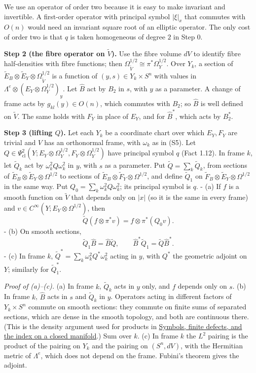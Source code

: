 \documentclass[
  11pt,
]{article}
\begin{document}
We use an operator of order two because it is easy to make invariant and
invertible. A first-order operator with principal symbol \(|\xi|_x\)
that commutes with \(O(n)\) would need an invariant square root of an
elliptic operator. The only cost of order two is that \(q\) is taken
homogeneous of degree \(2\) in Step 0.

\textbf{Step 2 (the fibre operator on \(\tilde V\)).} Use the fibre
volume \(dV\) to identify fibre half-densities with fibre functions;
then \(\Omega^{1/2}_{\tilde V}\cong\pi^*\Omega^{1/2}_Y\). Over \(Y_k\),
a section of
\(\tilde E_B\otimes\tilde E_Y\otimes\Omega^{1/2}_{\tilde V}\) is a
function of \((y,s)\in Y_k\times S^n\) with values in
\(\Lambda^e\otimes(E_Y\otimes\Omega^{1/2}_Y)_y\). Let \(\hat B\) act by
\(B_2\) in \(s\), with \(y\) as a parameter. A change of frame acts by
\(g_{kl}(y)\in O(n)\), which commutes with \(B_2\); so \(\hat B\) is
well defined on \(\tilde V\). The same holds with \(F_Y\) in place of
\(E_Y\), and for \(\hat B^*\), which acts by \(B_2^*\).

\textbf{Step 3 (lifting \(Q\)).} Let each \(Y_k\) be a coordinate chart
over which \(E_Y,F_Y\) are trivial and \(V\) has an orthonormal frame,
with \(\omega_k\) as in (S5). Let
\(Q\in\Psi^2_{\mathrm{cl}}(Y;E_Y\otimes\Omega_Y^{1/2},F_Y\otimes\Omega_Y^{1/2})\)
have principal symbol \(q\) (Fact 1.12). In frame \(k\), let
\(\tilde Q_k\) act by \(\omega_k^2Q\omega_k^2\) in \(y\), with \(s\) as
a parameter. Put \(\tilde Q=\sum_k\tilde Q_k\), from sections of
\(\tilde E_B\otimes\tilde E_Y\otimes\Omega^{1/2}\) to sections of
\(\tilde E_B\otimes\tilde F_Y\otimes\Omega^{1/2}\), and define
\(\tilde Q_1\) on \(\tilde F_B\otimes\tilde E_Y\otimes\Omega^{1/2}\) in
the same way. Put \(Q_0=\sum_k\omega_k^2Q\omega_k^2\); its principal
symbol is \(q\). - (a) If \(f\) is a smooth function on \(\tilde V\)
that depends only on \(|x|\) (so it is the same in every frame) and
\(v\in C^\infty(Y;E_Y\otimes\Omega^{1/2})\), then \[
\tilde Q(f\otimes\pi^*v)=f\otimes\pi^*(Q_0v).
\tag{10.2}
\] - (b) On smooth sections, \[
\tilde Q_1\hat B=\hat B\tilde Q,\qquad \hat B^*\tilde Q_1=\tilde Q\hat B^* .
\tag{10.3}
\] - (c) In frame \(k\), \(\tilde Q^*=\sum_k\omega_k^2Q^*\omega_k^2\)
acting in \(y\), with \(Q^*\) the geometric adjoint on \(Y\); similarly
for \(\tilde Q_1^*\).

\emph{Proof of (a)--(c).} (a) In frame \(k\), \(\tilde Q_k\) acts in
\(y\) only, and \(f\) depends only on \(s\). (b) In frame \(k\),
\(\hat B\) acts in \(s\) and \(\tilde Q_k\) in \(y\). Operators acting
in different factors of \(Y_k\times S^n\) commute on smooth sections:
they commute on finite sums of separated sections, which are dense in
the smooth topology, and both are continuous there. (This is the density
argument used for products in
\href{global-elliptic-symbol-index.pdf}{Symbols, finite defects, and the
index on a closed manifold}.) Sum over \(k\). (c) In frame \(k\) the
\(L^2\) pairing is the product of the pairing on \(Y_k\) and the pairing
on \((S^n,dV)\), with the Hermitian metric of \(\Lambda^e\), which does
not depend on the frame. Fubini's theorem gives the adjoint.
\end{document}
